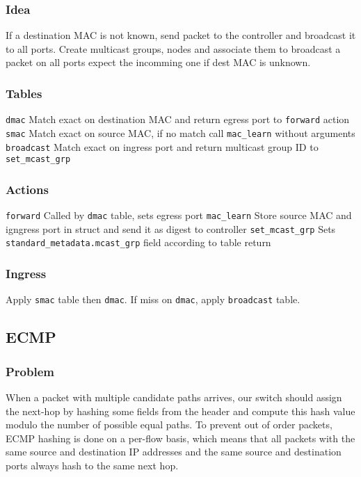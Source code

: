 \documentclass[a4paper, fontsize=8pt, landscape, DIV=1]{scrartcl}
\begin{document}
\begin{multicols*}{4}
  \subsubsection{Idea}
  If a destination MAC is not known, send packet to the controller and broadcast
  it to all ports. Create multicast groups, nodes and associate them to broadcast
  a packet on all ports expect the incomming one if dest MAC is unknown.

  \subsubsection{Tables} 
  \begin{outline}
  \1 \texttt{dmac}
    \2 Match exact on destination MAC and return egress port to \texttt{forward} action
  \1 \texttt{smac}
    \2 Match exact on source MAC, if no match call \texttt{mac\_learn} without arguments
  \1 \texttt{broadcast}
    \2 Match exact on ingress port and return multicast group ID to \texttt{set\_mcast\_grp}
  \end{outline}
  
  \subsubsection{Actions}
  \begin{outline}
  \1 \texttt{forward}
    \2 Called by \texttt{dmac} table, sets egress port
  \1 \texttt{mac\_learn}
    \2 Store source MAC and igngress port in struct and send it as digest to controller
  \1 \texttt{set\_mcast\_grp}
    \2 Sets \texttt{standard\_metadata.mcast\_grp} field according to table return
    
  \end{outline}

  \subsubsection{Ingress} 
  Apply \texttt{smac} table then \texttt{dmac}. If miss on \texttt{dmac}, apply \texttt{broadcast}
  table.


  \vfill\null
  \columnbreak
  \subsection{ECMP}
  \subsubsection{Problem} When a packet with multiple candidate paths arrives, our switch should 
  assign the next-hop by hashing some fields from the header and compute this 
  hash value modulo the number of possible equal paths. To prevent out of order 
  packets, ECMP hashing is done on a per-flow basis, which means that all packets
  with the same source and destination IP addresses and the same source and destination
  ports always hash to the same next hop.


\end{multicols*}
\end{document}
